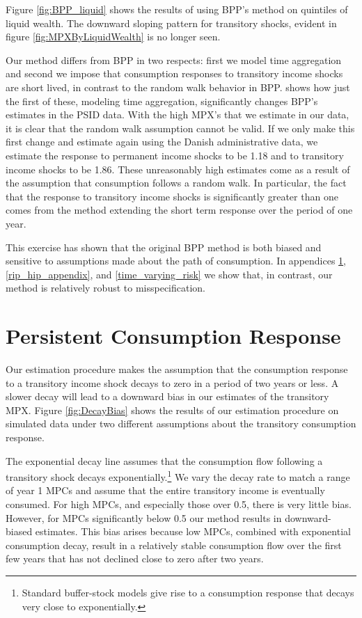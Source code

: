 \documentclass[titlepage]{\econtex}\newcommand{\texname}{ConsumptionHeterogeneity}
\begin{document}
	Figure \ref{fig:BPP_liquid} shows the results of using BPP's method on quintiles of liquid wealth. The downward sloping pattern for transitory shocks, evident in figure \ref{fig:MPXByLiquidWealth} is no longer seen.
	
	Our method differs from BPP in two respects: first we model time aggregation and second we impose that consumption responses to transitory income shocks are short lived, in contrast to the random walk behavior in BPP. \cite{crawley_time_2020} shows how just the first of these, modeling time aggregation, significantly changes BPP's estimates in the PSID data. With the high MPX's that we estimate in our data, it is clear that the random walk assumption cannot be valid. If we only make this first change and estimate again using the Danish administrative data, we estimate the response to permanent income shocks to be 1.18 and to transitory income shocks to be 1.86. These unreasonably high estimates come as a result of the assumption that consumption follows a random walk. In particular, the fact that the response to transitory income shocks is significantly greater than one comes from the method extending the short term response over the period of one year.
	
	This exercise has shown that the original BPP method is both biased and sensitive to assumptions made about the path of consumption. In appendices \ref{Consumption_persistence}, \ref{rip_hip_appendix}, and \ref{time_varying_risk} we show that, in contrast, our method is relatively robust to misspecification.
	
	\section{Persistent Consumption Response} \label{Consumption_persistence}
	\setcounter{figure}{0}   
	\setcounter{table}{0} 
	
	Our estimation procedure makes the assumption that the consumption response to a transitory income shock decays to zero in a period of two years or less. A slower decay will lead to a downward bias in our estimates of the transitory MPX. Figure \ref{fig:DecayBias} shows the results of our estimation procedure on simulated data under two different assumptions about the transitory consumption response.
	
	The exponential decay line assumes that the consumption flow following a transitory shock decays exponentially.\footnote{Standard buffer-stock models give rise to a consumption response that decays very close to exponentially.} We vary the decay rate to match a range of year 1 MPCs and assume that the entire transitory income is eventually consumed. For high MPCs, and especially those over 0.5, there is very little bias. However, for MPCs significantly below 0.5 our method results in downward-biased estimates. This bias arises because low MPCs, combined with exponential consumption decay, result in a relatively stable consumption flow over the first few years that has not declined close to zero after two years.
	
\end{document}
